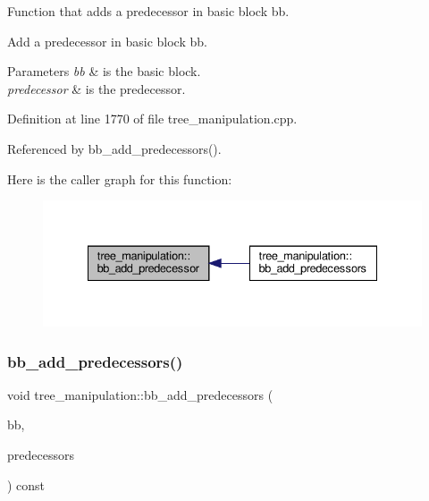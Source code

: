 Function that adds a predecessor in basic block bb. 

Add a predecessor in basic block bb.


\begin{DoxyParams}{Parameters}
{\em bb} & is the basic block. \\
\hline
{\em predecessor} & is the predecessor. \\
\hline
\end{DoxyParams}


Definition at line 1770 of file tree\+\_\+manipulation.\+cpp.



Referenced by bb\+\_\+add\+\_\+predecessors().

Here is the caller graph for this function\+:
\nopagebreak
\begin{figure}[H]
\begin{center}
\leavevmode
\includegraphics[width=335pt]{d0/d99/classtree__manipulation_ae2668d4d94dcfceb8077a7d849fc89a1_icgraph}
\end{center}
\end{figure}
\mbox{\label{classtree__manipulation_ac4ed822186d388113d2229bd736f6cba}} 
\subsubsection{\texorpdfstring{bb\+\_\+add\+\_\+predecessors()}{bb\_add\_predecessors()}}
{\footnotesize\ttfamily void tree\+\_\+manipulation\+::bb\+\_\+add\+\_\+predecessors (\begin{DoxyParamCaption}\item[{bloc\+Ref \&}]{bb,  }\item[{const std\+::vector$<$ unsigned int $>$ \&}]{predecessors }\end{DoxyParamCaption}) const}



